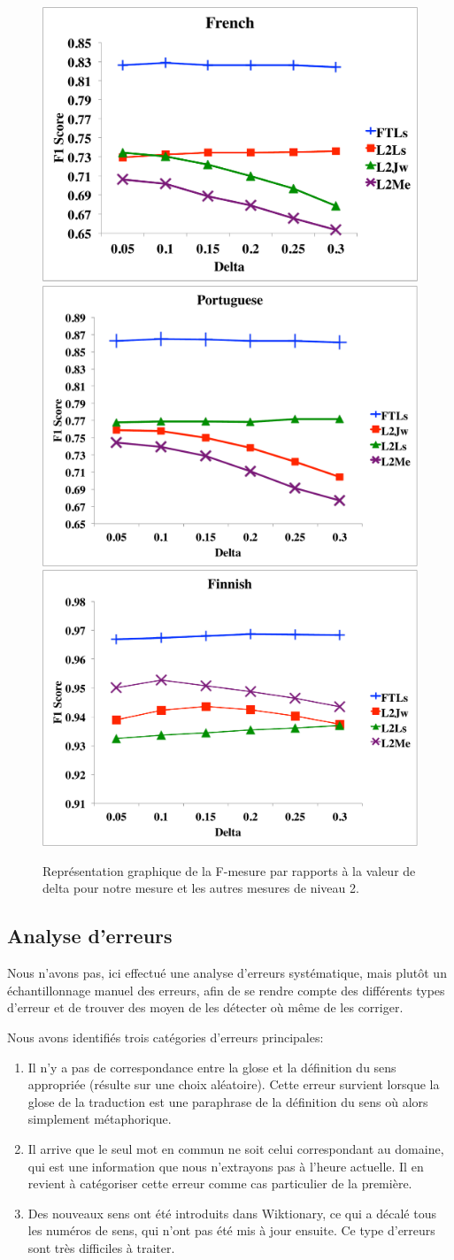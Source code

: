 \documentclass[10pt,a4paper,twoside]{article}
\begin{document}
\begin{figure}
\centering
\includegraphics[width=.35\columnwidth]{french}
\includegraphics[width=.35\columnwidth]{portuguese}
\includegraphics[width=.35\columnwidth]{finnish}
\caption{Représentation  graphique de la  F-mesure par rapports à la valeur de  delta pour notre mesure et les autres mesures de niveau 2.}
\label{fig.2}
\end{figure}

\subsection{Analyse d'erreurs}


Nous n'avons pas, ici effectué une analyse d'erreurs systématique, mais plutôt un échantillonnage manuel des erreurs, afin de se rendre compte des différents types d'erreur et de trouver des moyen de les détecter où même de les corriger.

Nous avons identifiés trois catégories d'erreurs principales:
\begin{enumerate}
\item Il n'y a pas de correspondance entre la glose et la définition du sens appropriée (résulte sur une choix aléatoire). Cette erreur survient lorsque la glose de la traduction est une paraphrase de la définition du sens où alors simplement métaphorique.
\item Il arrive que le seul mot en commun ne soit celui correspondant au domaine, qui est une information que nous n'extrayons pas à l'heure actuelle. Il en revient à catégoriser cette erreur comme cas particulier de la première.
\item Des nouveaux sens ont été introduits dans Wiktionary, ce qui a décalé tous les numéros de sens, qui n'ont pas été mis à jour ensuite. Ce type d'erreurs sont très difficiles à traiter.
\end{enumerate}
\end{document}
